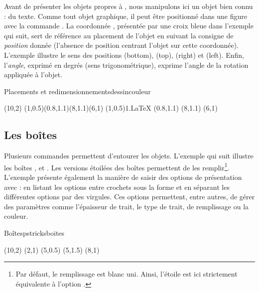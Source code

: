 Avant de présenter les objets propres à , nous manipulons ici un objet bien connu : du texte. Comme tout objet graphique, il peut être positionné dans une figure avec la commande . La coordonnée , présentée par une croix bleue dans l'exemple qui suit, sert de référence au placement de l'objet en suivant la consigne de \emph{position} donnée (l'absence de position centrant l'objet sur cette coordonnée). L'exemple illustre le sens des positions (bottom), (top), (right) et (left). Enfin, l'\emph{angle}, exprimé en degrés (sens trigonométrique), exprime l'angle de la rotation appliquée à l'objet.

\begin{codedoublefig}{Placements et redimensionnements}{dessincouleur}
\begin{pspicture}(10,2)
\psdots[dotstyle=BoldMul,linecolor=bleu6](1,0.5)(0.8,1.1)(8,1.1)(6,1)
\rput(1,0.5){1.\LaTeX}
\rput[bl](0.8,1.1){}
(8,1.1){}
\rput[tr](6,1){}
\end{pspicture}
\end{codedoublefig}

\subsection{Les boîtes} \label{psboites}

Plusieurs commandes permettent d'entourer les objets. L'exemple qui suit illustre les boîtes ,  et . Les versions étoilées des boîtes permettent de les remplir\footnote{Par défaut, le remplissage est blanc uni. Ainsi, l'étoile est ici strictement équivalente à l'option .}. L'exemple présente également la manière de saisir des options de présentation avec  : en listant les options entre crochets sous la forme  et en séparant les différentes options par des virgules. Ces options permettent, entre autres, de gérer des paramètres comme l'épaisseur de trait, le type de trait, de remplissage ou la couleur.

\begin{codedoublefig}{Boîtes}{pstricksboites}
\begin{pspicture}(10,2)
\rput(2,1){}
\rput(5,0.5){}
\rput(5,1.5){}
\rput(8,1){}
\end{pspicture}
\end{codedoublefig}

